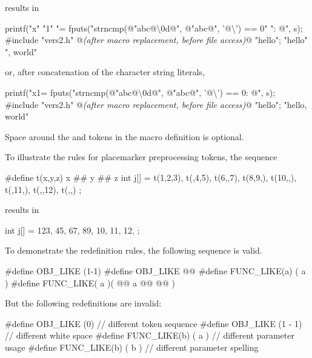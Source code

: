 results in

\begin{codeblock}
printf("x" "1" "= %
fputs("strncmp(@\textbackslash@"abc@\textbackslash\textbackslash@0d@\textbackslash@", @\textbackslash@"abc@\textbackslash@", '@\textbackslash{}') == 0" ": @\atsign\textbackslash@n", s);
#include "vers2.h"    @\textit{(after macro replacement, before file access)}@
"hello";
"hello" ", world"
\end{codeblock}

or, after concatenation of the character string literals,

\begin{codeblock}
printf("x1= %
fputs("strncmp(@\textbackslash@"abc@\textbackslash\textbackslash@0d@\textbackslash@", @\textbackslash@"abc@\textbackslash@", '@\textbackslash{}') == 0: @\atsign\textbackslash@n", s);
#include "vers2.h"    @\textit{(after macro replacement, before file access)}@
"hello";
"hello, world"
\end{codeblock}

Space around the
\tcode{\#}
and
\tcode{\#\#}
tokens in the macro definition is optional.

\pnum
To illustrate the rules for placemarker preprocessing tokens, the sequence

\begin{codeblock}
#define t(x,y,z) x ## y ## z
int j[] = { t(1,2,3), t(,4,5), t(6,,7), t(8,9,),
  t(10,,), t(,11,), t(,,12), t(,,) };
\end{codeblock}

results in

\begin{codeblock}
int j[] = { 123, 45, 67, 89,
  10, 11, 12, };
\end{codeblock}

\pnum
To demonstrate the redefinition rules,
the following sequence is valid.

\begin{codeblock}
#define OBJ_LIKE      (1-1)
#define OBJ_LIKE      @@
#define FUNC_LIKE(a)   ( a )
#define FUNC_LIKE( a )(     @@
                a @@
                  @\tcode{*/}@ )
\end{codeblock}

But the following redefinitions are invalid:

\begin{codeblock}
#define OBJ_LIKE    (0)      // different token sequence
#define OBJ_LIKE    (1 - 1)  // different white space
#define FUNC_LIKE(b) ( a )   // different parameter usage
#define FUNC_LIKE(b) ( b )   // different parameter spelling
\end{codeblock}

